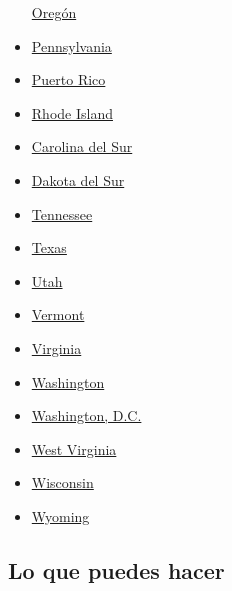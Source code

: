 \begin{itemize}
  \href{https://www.nytimes.com/interactive/2020/us/oregon-coronavirus-cases.html}{Oregón}
\item
  \href{https://www.nytimes.com/interactive/2020/us/pennsylvania-coronavirus-cases.html}{Pennsylvania}
\item
  \href{https://www.nytimes.com/interactive/2020/us/puerto-rico-coronavirus-cases.html}{Puerto
  Rico}
\item
  \href{https://www.nytimes.com/interactive/2020/us/rhode-island-coronavirus-cases.html}{Rhode
  Island}
\item
  \href{https://www.nytimes.com/interactive/2020/us/south-carolina-coronavirus-cases.html}{Carolina
  del Sur}
\item
  \href{https://www.nytimes.com/interactive/2020/us/south-dakota-coronavirus-cases.html}{Dakota
  del Sur}
\item
  \href{https://www.nytimes.com/interactive/2020/us/tennessee-coronavirus-cases.html}{Tennessee}
\item
  \href{https://www.nytimes.com/interactive/2020/us/texas-coronavirus-cases.html}{Texas}
\item
  \href{https://www.nytimes.com/interactive/2020/us/utah-coronavirus-cases.html}{Utah}
\item
  \href{https://www.nytimes.com/interactive/2020/us/vermont-coronavirus-cases.html}{Vermont}
\item
  \href{https://www.nytimes.com/interactive/2020/us/virginia-coronavirus-cases.html}{Virginia}
\item
  \href{https://www.nytimes.com/interactive/2020/us/washington-coronavirus-cases.html}{Washington}
\item
  \href{https://www.nytimes.com/interactive/2020/us/washington-dc-coronavirus-cases.html}{Washington,
  D.C.}
\item
  \href{https://www.nytimes.com/interactive/2020/us/west-virginia-coronavirus-cases.html}{West
  Virginia}
\item
  \href{https://www.nytimes.com/interactive/2020/us/wisconsin-coronavirus-cases.html}{Wisconsin}
\item
  \href{https://www.nytimes.com/interactive/2020/us/wyoming-coronavirus-cases.html}{Wyoming}
\end{itemize}

\hypertarget{lo-que-puedes-hacer}{%
\subsection{Lo que puedes hacer}\label{lo-que-puedes-hacer}}


